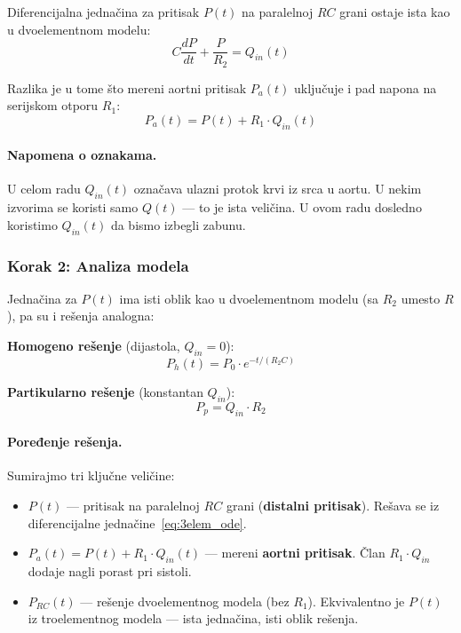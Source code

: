 \documentclass[12pt,a4paper]{article}
\begin{document}

Diferencijalna jednačina za pritisak $P(t)$ na paralelnoj $RC$ grani ostaje ista kao u dvoelementnom modelu:
\begin{equation}
    C \frac{dP}{dt} + \frac{P}{R_2} = Q_{in}(t)
    \label{eq:3elem_ode}
\end{equation}

Razlika je u tome što mereni aortni pritisak $P_a(t)$ uključuje i pad napona na serijskom otporu $R_1$:
\begin{equation}
    \boxed{P_a(t) = P(t) + R_1 \cdot Q_{in}(t)}
    \label{eq:Pa}
\end{equation}

\paragraph{Napomena o oznakama.} U celom radu $Q_{in}(t)$ označava ulazni protok krvi iz srca u aortu. U nekim izvorima se koristi samo $Q(t)$ --- to je ista veličina. U ovom radu dosledno koristimo $Q_{in}(t)$ da bismo izbegli zabunu.

\subsubsection{Korak 2: Analiza modela}

Jednačina za $P(t)$ ima isti oblik kao u dvoelementnom modelu (sa $R_2$ umesto $R$), pa su i rešenja analogna:

\textbf{Homogeno rešenje} (dijastola, $Q_{in} = 0$):
\begin{equation}
    P_h(t) = P_0 \cdot e^{-t/(R_2 C)}
\end{equation}

\textbf{Partikularno rešenje} (konstantan $Q_{in}$):
\begin{equation}
    P_p = Q_{in} \cdot R_2
\end{equation}

\paragraph{Poređenje rešenja.} Sumirajmo tri ključne veličine:
\begin{itemize}
    \item $P(t)$ --- pritisak na paralelnoj $RC$ grani (\textbf{distalni pritisak}). Rešava se iz diferencijalne jednačine~\eqref{eq:3elem_ode}.
    \item $P_a(t) = P(t) + R_1 \cdot Q_{in}(t)$ --- mereni \textbf{aortni pritisak}. Član $R_1 \cdot Q_{in}$ dodaje nagli porast pri sistoli.
    \item $P_{RC}(t)$ --- rešenje dvoelementnog modela (bez $R_1$). Ekvivalentno je $P(t)$ iz troelementnog modela --- ista jednačina, isti oblik rešenja.
\end{itemize}
\end{document}
